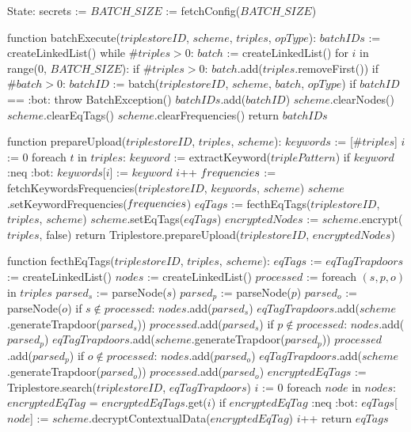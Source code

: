 State:
    secrets := {}
    $BATCH\_SIZE$ := fetchConfig($BATCH\_SIZE$)

function batchExecute($triplestoreID$, $scheme$, $triples$, $opType$):
    $batchIDs$ := createLinkedList()
    while $\#triples > 0$: 
        $batch$ := createLinkedList()
        for $i$ in range(0, $BATCH\_SIZE$):
            if $\#triples > 0$:
                $batch$.add($triples$.removeFirst())
        if $\#batch > 0$:
            $batchID$ := batch($triplestoreID$, $scheme$, $batch$, $opType$)
            if $batchID$ == :bot:
                throw BatchException()
            $batchIDs$.add($batchID$)
        $scheme$.clearNodes()
    $scheme$.clearEqTags()
    $scheme$.clearFrequencies()
    return $batchIDs$
        
function prepareUpload($triplestoreID$, $triples$, $scheme$):
    $keywords$ := [$\#triples$]
    $i$ := 0
    foreach $t$ in $triples$:
        $keyword$ := extractKeyword($triplePattern$) 
        if $keyword$ :neq :bot:
            $keywords$[$i$] := $keyword$
            $i$++
    $\textrm{\emph{f}}requencies$ := fetchKeywordsFrequencies($triplestoreID$, $keywords$, $scheme$)
    $scheme$.setKeywordFrequencies($\textrm{\emph{f}}requencies$)
    $eqTags$ := fecthEqTags($triplestoreID$, $triples$, $scheme$)
    $scheme$.setEqTags($eqTags$)
    $encryptedNodes$ := $scheme$.encrypt($triples$, false)
    return Triplestore.prepareUpload($triplestoreID$, $encryptedNodes$)

function fecthEqTags($triplestoreID$, $triples$, $scheme$):
    $eqTags$ := {}
    $eqTagTrapdoors$ := createLinkedList()
    $nodes$ := createLinkedList()
    $processed$ := {}
    foreach $(s, p, o)$ in $triples$
        $parsed_s$ := parseNode($s$)
        $parsed_p$ := parseNode($p$)
        $parsed_o$ := parseNode($o$)
        if $s \notin processed$:
            $nodes$.add($parsed_s$)
            $eqTagTrapdoors$.add($scheme$.generateTrapdoor($parsed_s$))
            $processed$.add($parsed_s$)
        if $p \notin processed$:
            $nodes$.add($parsed_p$)
            $eqTagTrapdoors$.add($scheme$.generateTrapdoor($parsed_p$))
            $processed$.add($parsed_p$)
        if $o \notin processed$:
            $nodes$.add($parsed_o$)
            $eqTagTrapdoors$.add($scheme$.generateTrapdoor($parsed_o$))
            $processed$.add($parsed_o$)
    $encryptedEqTags$ := Triplestore.search($triplestoreID$, $eqTagTrapdoors$)
    $i$ := 0
    foreach $node$ in $nodes$:
        $encryptedEqTag$ = $encryptedEqTags$.get($i$)
        if $encryptedEqTag$ :neq :bot:
            $eqTags$[$node$] := $scheme$.decryptContextualData($encryptedEqTag$)
        $i$++
    return $eqTags$

